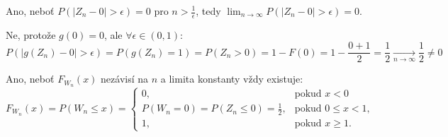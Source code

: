 \documentclass[12pt]{article}					%
\begin{document}
\begin{priklad}[1]
	\begin{reseni}[b)]
		Ano, neboť $P(|Z_n - 0| > \epsilon) = 0$ pro $n > \frac{1}{\epsilon}$, tedy $\lim_{n \rightarrow ∞} P(|Z_n - 0| > \epsilon) = 0$.
	\end{reseni}

	\begin{reseni}[c)]
		Ne, protože $g(0) = 0$, ale $\forall \epsilon \in (0, 1):$
		$$ P(|g(Z_n) - 0| > \epsilon) = P(g(Z_n) = 1) = P(Z_n > 0) = 1 - F(0) = 1 - \frac{0 + 1}{2} = \frac{1}{2} \underset{n \rightarrow ∞}\longrightarrow \frac{1}{2} ≠ 0 $$
	\end{reseni}

	\begin{reseni}[d)]
		Ano, neboť $F_{W_n}(x)$ nezávisí na $n$ a limita konstanty vždy existuje:
		$$ F_{W_n}(x) = P(W_n ≤ x) = \begin{cases}0, & \text{pokud } x < 0\\P(W_n = 0) = P(Z_n ≤ 0) = \frac{1}{2}, & \text{pokud } 0 ≤ x < 1, \\ 1, & \text{pokud } x ≥ 1.\end{cases} $$
	\end{reseni}
\end{priklad}

\pagebreak
\end{document}
